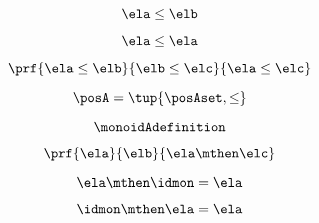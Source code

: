 \begin{forslides}
    \begin{equation}
        \label{eq:semicats-slides-138}
        \ela \leq \elb
    \end{equation}

    \begin{equation}
        \label{eq:semicats-slides-139}
        \ela \leq \ela
    \end{equation}

    \begin{equation}
        \label{eq:semicats-slides-140}
        \prf{
            \ela \leq \elb
        }{
            \elb \leq \elc
        }{
            \ela \leq \elc
        }
    \end{equation}

    \begin{equation}
        \label{eq:semicats-slides-141}
        \posA = \tup{\posAset, \leq}
    \end{equation}

    \begin{equation}
        \label{eq:semicats-slides-142}
        \monoidAdefinition
    \end{equation}

    \begin{equation}
        \label{eq:semicats-slides-143}
        \prf{
            \ela
        }{
            \elb
        }{
            \ela \mthen \elc
        }
    \end{equation}

    \begin{equation}
        \label{eq:semicats-slides-144}
        \ela \mthen \idmon = \ela
    \end{equation}

    \begin{equation}
        \label{eq:semicats-slides-145}
        \idmon \mthen \ela = \ela
    \end{equation}

    \begin{comment}
    \begin{equation}
        \label{eq:semicats-slides-146}

    \end{equation}

    \begin{equation}
        \label{eq:semicats-slides-147}

    \end{equation}

    \begin{equation}
        \label{eq:semicats-slides-148}


\end{comment}
\end{forslides}
